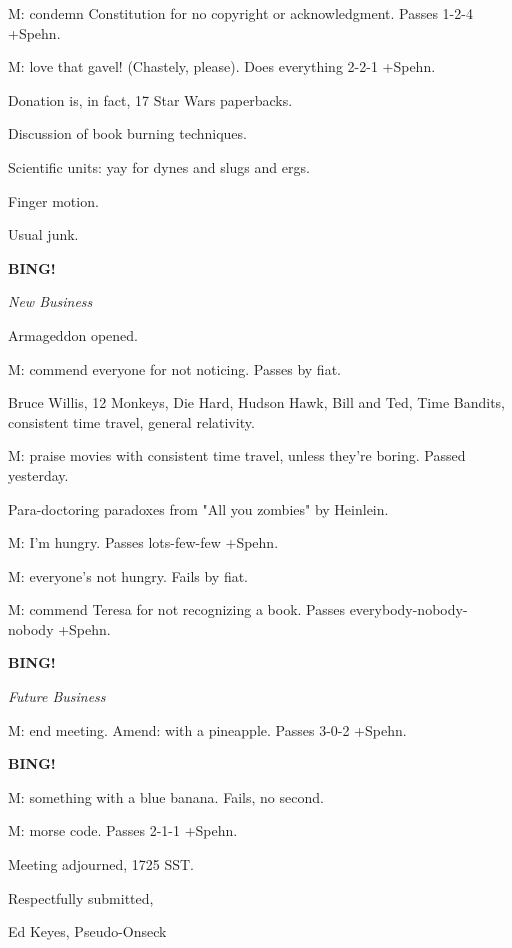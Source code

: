 \documentclass[12pt]{article}
\newcommand{\bing}{{\bf BING!} }
\newcommand{\goto}[1]{\bing \vskip 12pt \centerline{{\em{#1}}}}
\begin{document}
M: condemn Constitution for no copyright or acknowledgment. Passes 1-2-4 +Spehn.

M: love that gavel! (Chastely, please). Does everything 2-2-1 +Spehn.

Donation is, in fact, 17 Star Wars paperbacks.

Discussion of book burning techniques.

Scientific units: yay for dynes and slugs and ergs.

Finger motion.

Usual junk.

\goto{New Business}

Armageddon opened.

M: commend everyone for not noticing. Passes by fiat.

Bruce Willis, 12 Monkeys, Die Hard, Hudson Hawk, Bill and Ted, Time Bandits, consistent time travel, general relativity.

M: praise movies with consistent time travel, unless they're boring. Passed yesterday.

Para-doctoring paradoxes from "All you zombies" by Heinlein.

M: I'm hungry. Passes lots-few-few +Spehn.

M: everyone's not hungry. Fails by fiat.

M: commend Teresa for not recognizing a book. Passes everybody-nobody-nobody +Spehn.

\goto{Future Business}

M: end meeting. Amend: with a pineapple. Passes 3-0-2 +Spehn.

\bing

M: something with a blue banana. Fails, no second.

M: morse code. Passes 2-1-1 +Spehn.

\vspace{12pt}

\noindent
Meeting adjourned, 1725 SST.

\vspace{18pt}

\centerline{Respectfully submitted,}
\centerline{Ed Keyes, Pseudo-Onseck}
\end{document}
